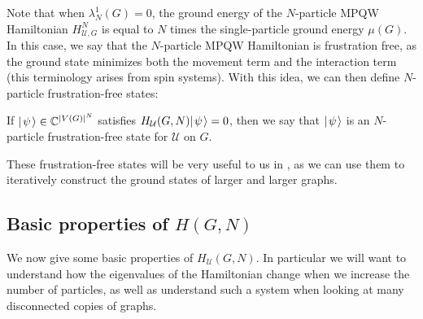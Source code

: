 \documentclass[../thesis-main/thesis-main]{subfiles}
\begin{document}
Note that when $\lambda_N^1(G) = 0$, the ground energy of the $N$-particle MPQW Hamiltonian $H_{\mathcal{U},G}^N$ is equal to $N$ times the single-particle ground energy $\mu(G)$.  In this case, we say that the $N$-particle MPQW Hamiltonian is frustration free, as the ground state minimizes both the movement term and the interaction term (this terminology arises from spin systems).  With this idea, we can then define $N$-particle frustration-free states:
\begin{definition}  
  If $|\mspace{2mu} \psi \mspace{2mu} \rangle\in \mathbb{C}^{|V(G)|^N}$ satisfies $H_{\mathcal{U}}(G,N) |\mspace{2mu} \psi \mspace{2mu} \rangle = 0$, then we say that $|\mspace{2mu} \psi \mspace{2mu} \rangle$ is an $N$-particle frustration-free state for $\mathcal{U}$ on $G$.
\end{definition}
These frustration-free states will be very useful to us in , as we can use them to iteratively construct the ground states of larger and larger graphs.






\subsection{Basic properties of $H(G,N)$}

We now give some basic properties of $H_{\mathcal{U}}(G,N)$.  In particular we will want to understand how the eigenvalues of the Hamiltonian change when we increase the number of particles, as well as understand such a system when looking at many disconnected copies of graphs.
\end{document}
